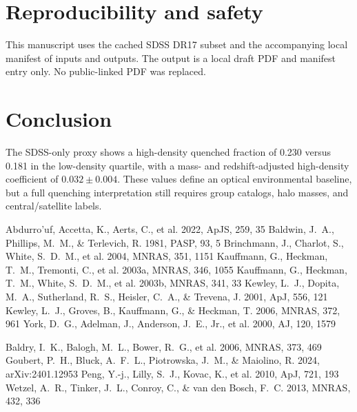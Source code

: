 \documentclass[twocolumn]{aastex631}
\begin{document}
\section{Reproducibility and safety}\label{sec:repro}
This manuscript uses the cached SDSS DR17 subset and the accompanying local manifest of inputs and outputs. The output is a local draft PDF and manifest entry only. No public-linked PDF was replaced.

\section{Conclusion}\label{sec:conclusion}
The SDSS-only proxy shows a high-density quenched fraction of 0.230 versus 0.181 in the low-density quartile, with a mass- and redshift-adjusted high-density coefficient of $0.032 \pm 0.004$. These values define an optical environmental baseline, but a full quenching interpretation still requires group catalogs, halo masses, and central/satellite labels.


\begin{thebibliography}{}
 Abdurro'uf, Accetta, K., Aerts, C., et al. 2022, ApJS, 259, 35
 Baldwin, J.~A., Phillips, M.~M., \& Terlevich, R. 1981, PASP, 93, 5
 Brinchmann, J., Charlot, S., White, S.~D.~M., et al. 2004, MNRAS, 351, 1151
 Kauffmann, G., Heckman, T.~M., Tremonti, C., et al. 2003a, MNRAS, 346, 1055
 Kauffmann, G., Heckman, T.~M., White, S.~D.~M., et al. 2003b, MNRAS, 341, 33
 Kewley, L.~J., Dopita, M.~A., Sutherland, R.~S., Heisler, C.~A., \& Trevena, J. 2001, ApJ, 556, 121
 Kewley, L.~J., Groves, B., Kauffmann, G., \& Heckman, T. 2006, MNRAS, 372, 961
 York, D.~G., Adelman, J., Anderson, J.~E., Jr., et al. 2000, AJ, 120, 1579

 Baldry, I.~K., Balogh, M.~L., Bower, R.~G., et al. 2006, MNRAS, 373, 469
 Goubert, P.~H., Bluck, A.~F.~L., Piotrowska, J.~M., \& Maiolino, R. 2024, arXiv:2401.12953
 Peng, Y.-j., Lilly, S.~J., Kovac, K., et al. 2010, ApJ, 721, 193
 Wetzel, A.~R., Tinker, J.~L., Conroy, C., \& van den Bosch, F.~C. 2013, MNRAS, 432, 336
\end{thebibliography}
\end{document}
